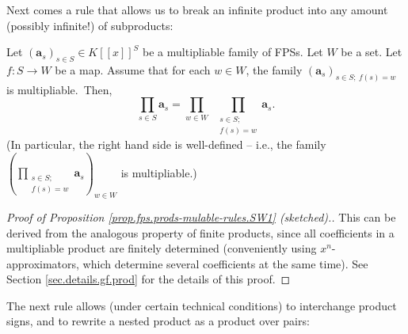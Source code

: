 Next comes a rule that allows us to break an infinite product into any amount
(possibly infinite!) of subproducts:

\begin{proposition}
\label{prop.fps.prods-mulable-rules.SW1}Let $\left(  \mathbf{a}_{s}\right)
_{s\in S}\in K\left[  \left[  x\right]  \right]  ^{S}$ be a multipliable
family of FPSs. Let $W$ be a set. Let $f:S\rightarrow W$ be a map. Assume that
for each $w\in W$, the family $\left(  \mathbf{a}_{s}\right)  _{s\in
S;\ f\left(  s\right)  =w}$ is multipliable.\footnotemark\ Then,%
\begin{equation}
\prod_{s\in S}\mathbf{a}_{s}=\prod_{w\in W}\ \ \prod_{\substack{s\in
S;\\f\left(  s\right)  =w}}\mathbf{a}_{s}.
\label{eq.prop.fps.prods-mulable-rules.SW1.eq}%
\end{equation}
(In particular, the right hand side is well-defined -- i.e., the family
$\left(  \prod_{\substack{s\in S;\\f\left(  s\right)  =w}}\mathbf{a}%
_{s}\right)  _{w\in W}$ is multipliable.)
\end{proposition}


\begin{proof}
[Proof of Proposition \ref{prop.fps.prods-mulable-rules.SW1} (sketched).]This
can be derived from the analogous property of finite products, since all
coefficients in a multipliable product are finitely determined (conveniently
using $x^{n}$-approximators, which determine several coefficients at the same
time). See Section \ref{sec.details.gf.prod} for the details of this proof.
\end{proof}

The next rule allows (under certain technical conditions) to interchange
product signs, and to rewrite a nested product as a product over pairs:

